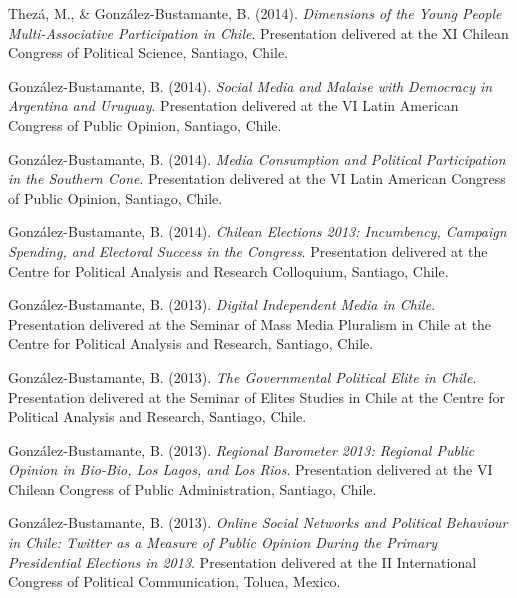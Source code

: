 \begin{publications}
\begin{benumerate}{72}
\item{\small Thezá, M., \& González-Bustamante, B. (2014). {\itshape Dimensions of the Young People Multi-Associative Participation in Chile}. Presentation delivered at the XI Chilean Congress of Political Science, Santiago, Chile.}\vspace{1mm}

\item{\small González-Bustamante, B. (2014). {\itshape Social Media and Malaise with Democracy in Argentina and Uruguay}. Presentation delivered at the VI Latin American Congress of Public Opinion, Santiago, Chile.}\vspace{1mm}

\item{\small González-Bustamante, B. (2014). {\itshape Media Consumption and Political Participation in the Southern Cone}. Presentation delivered at the VI Latin American Congress of Public Opinion, Santiago, Chile.}\vspace{1mm}

\item{\small González-Bustamante, B. (2014). {\itshape Chilean Elections 2013: Incumbency, Campaign Spending, and Electoral Success in the Congress}. Presentation delivered at the Centre for Political Analysis and Research Colloquium, Santiago, Chile.}\vspace{1mm}

\item{\small González-Bustamante, B. (2013). {\itshape Digital Independent Media in Chile}. Presentation delivered at the Seminar of Mass Media Pluralism in Chile at the Centre for Political Analysis and Research, Santiago, Chile.}\vspace{1mm}

\item{\small González-Bustamante, B. (2013). {\itshape The Governmental Political Elite in Chile}. Presentation delivered at the Seminar of Elites Studies in Chile at the Centre for Political Analysis and Research, Santiago, Chile.}\vspace{1mm}

\item{\small González-Bustamante, B. (2013). {\itshape Regional Barometer 2013: Regional Public Opinion in Bio-Bio, Los Lagos, and Los Rios}. Presentation delivered at the VI Chilean Congress of Public Administration, Santiago, Chile.}\vspace{1mm}

\item{\small González-Bustamante, B. (2013). {\itshape Online Social Networks and Political Behaviour in Chile: Twitter as a Measure of Public Opinion During the Primary Presidential Elections in 2013}. Presentation delivered at the II International Congress of Political Communication, Toluca, Mexico.}\vspace{1mm}


\end{benumerate}
\end{publications}
